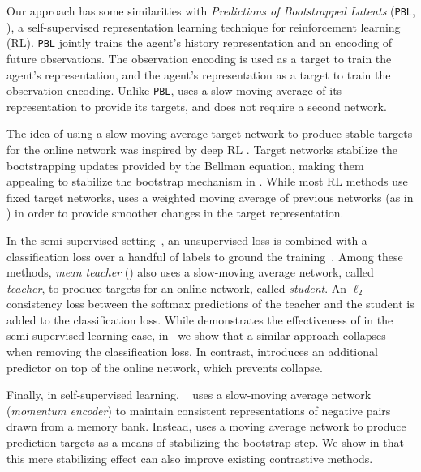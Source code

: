 Our approach has some similarities with \textit{Predictions of Bootstrapped Latents} (\texttt{PBL}, \cite{guo2020bootstrap}), a self-supervised representation learning technique for reinforcement learning (RL). \texttt{PBL} jointly trains the agent's history representation and an encoding of future observations. The observation encoding is used as a target to train the agent's representation, and the agent's representation as a target to train the observation encoding. Unlike \texttt{PBL}, \algo uses a slow-moving average of its representation to provide its targets, and does not require a second network.


The idea of using a slow-moving average target network to produce stable targets for the online network was inspired by  deep RL \cite{DQNNature, mnih2016asynchronous, hessel2018rainbow, van2018deep}. Target networks stabilize the bootstrapping updates provided by the Bellman equation, making them appealing to stabilize the bootstrap mechanism in \algo. While most RL methods use fixed target networks, \algo uses a weighted moving average of previous networks (as in \cite{DDPG}) in order to provide smoother changes in the target representation. %


In the semi-supervised setting~\cite{chapelle2009semi,zhu2009introduction}, an unsupervised loss is combined with a classification loss over a handful of labels to ground the training~\cite{laine2016temporal,tarvainen2017mean,kingma2014semi,rasmus2015semi,berthelot2019mixmatch,miyato2018virtual,Berthelot2020ReMixMatchSL,sohn2020fixmatch}. Among these methods, \textit{mean teacher} (\MT) \cite{tarvainen2017mean} also uses a slow-moving average network, called \textit{teacher}, to produce targets for an online network, called \textit{student}. %
An $\ell_2$ consistency loss between the softmax predictions of the teacher and the student is added to the classification loss.
While \cite{tarvainen2017mean} demonstrates the effectiveness of \MT in the semi-supervised learning case, in~ we show that a similar approach collapses when removing the classification loss. In contrast, \algo introduces an additional predictor on top of the online network, which prevents collapse. 

Finally, in self-supervised learning, \moco~\cite{MOCO} uses a slow-moving average network (\emph{momentum encoder}) to maintain consistent representations of negative pairs drawn from a memory bank. Instead, \algo uses a moving average network to produce prediction targets as a means of stabilizing the bootstrap step. We show in  that this mere stabilizing effect can also improve existing contrastive methods.

